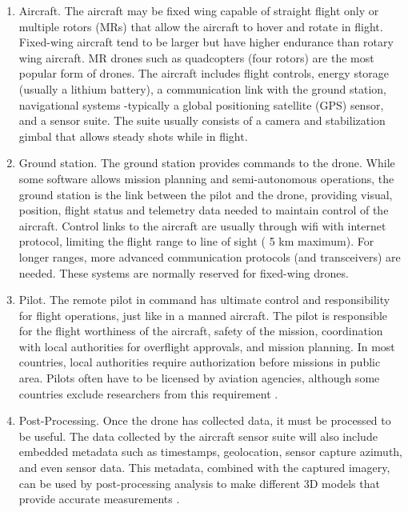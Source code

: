 \documentclass[preprint,12pt,a4paper]{elsarticle}
\begin{document}
\begin{linenumbers}
\begin{enumerate}
\item Aircraft. The aircraft may be fixed wing capable of straight flight only or multiple rotors (MRs) that allow the aircraft to hover and rotate in flight. Fixed-wing aircraft tend to be larger but have higher endurance than rotary wing aircraft. MR drones such as quadcopters (four rotors) are the most popular form of drones. The aircraft includes flight controls, energy storage (usually a lithium battery), a communication link with the ground station, navigational systems -typically a global positioning satellite (GPS) sensor, and a sensor suite. The suite usually consists of a camera and stabilization gimbal that allows steady shots while in flight. 

\item Ground station. The ground station provides commands to the drone. While some software allows mission planning and semi-autonomous operations, the ground station is the link between the pilot and the drone, providing visual, position, flight status and telemetry data needed to maintain control of the aircraft. Control links to the aircraft are usually through wifi with internet protocol, limiting the flight range to line of sight ( 5 km maximum). For longer ranges, more advanced communication protocols (and transceivers) are needed. These systems are normally reserved for fixed-wing drones.

\item Pilot. The remote pilot in command has ultimate control and responsibility for flight operations, just like in a manned aircraft. The pilot is responsible for the flight worthiness of the aircraft, safety of the mission, coordination with local authorities for overflight approvals, and mission planning. In most countries, local authorities require authorization before missions in public area. Pilots often have to be licensed by aviation agencies, although some countries exclude researchers from this requirement \citep{UAVCoach2017}.

\item Post-Processing. Once the drone has collected data, it must be processed to be useful. The data collected by the aircraft sensor suite will also include embedded metadata such as timestamps, geolocation, sensor capture azimuth, and even sensor data. This metadata, combined with the captured imagery, can be used by post-processing analysis to make different 3D models that provide accurate measurements \citep{Sona2014}. 


\end{enumerate}
\end{linenumbers}
\end{document}
